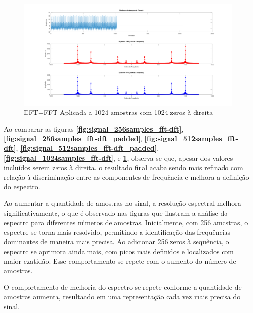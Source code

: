 \begin{figure}[H]
    \centering
    \includegraphics[width=1\linewidth]{03_experimental_analysis//assets/plot_results/1024_samples_dft_fft_padded.png}
    \caption{DFT+FFT Aplicada a 1024 amostras com 1024 zeros à direita}
    \label{fig:signal_1024samples_fft-dft_padded}
\end{figure}


Ao comparar as figuras \textbf{\ref{fig:signal_256samples_fft-dft}}, \textbf{\ref{fig:signal_256samples_fft-dft_padded}}, \textbf{\ref{fig:signal_512samples_fft-dft}}, \textbf{\ref{fig:signal_512samples_fft-dft_padded}}, \textbf{\ref{fig:signal_1024samples_fft-dft}}, e \textbf{\ref{fig:signal_1024samples_fft-dft_padded}}, observa-se que,  apesar dos valores incluídos serem zeros à direita, o resultado final acaba sendo mais refinado com relação à discriminação entre as componentes de frequência e melhora a definição do espectro.

Ao aumentar a quantidade de amostras no sinal, a resolução espectral melhora significativamente, o que é observado nas figuras que ilustram a análise do espectro para diferentes números de amostras. Inicialmente, com 256 amostras, o espectro se torna mais resolvido, permitindo a identificação das frequências dominantes de maneira mais precisa. Ao adicionar 256 zeros à sequência, o espectro se aprimora ainda mais, com picos mais definidos e localizados com maior exatidão. Esse comportamento se repete com o aumento do número de amostras.

O comportamento de melhoria do espectro se repete conforme a quantidade de amostras aumenta, resultando em uma representação cada vez mais precisa do sinal.
